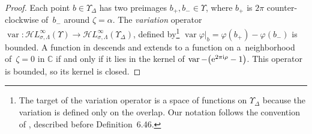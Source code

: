 \documentclass[pdftex]{sigma}
\newcommand{\singexp}[2]{\mathcal{H}L^\infty_{#1, #2}}
\newcommand{\maps}{\colon}
\newcommand{\C}{\mathbb{C}}
\DeclareMathOperator{\var}{var}
\numberwithin{equation}{section}
\begin{document}
\begin{proof}
Each point $b \in \Upsilon_\Delta$ has two preimages $b_+, b_- \in \Upsilon$, where $b_+$ is $2\pi$ counter-clockwise of~$b_-$ around $\zeta = \alpha$. The {\em variation} operator $\var \maps \singexp{\sigma}{\Lambda}(\Upsilon) \to \singexp{\sigma}{\Lambda}(\Upsilon_\Delta)$, defined by\footnote{The target of the variation operator is a space of functions on $\Upsilon_\Delta$ because the variation is defined only on the overlap. Our notation follows the convention of \cite{diverg-resurg-i}, described before Definition~6.46.}
$\var \varphi \big|_b = \varphi(b_+) - \varphi(b_-) $
is bounded. A function in \smash{$\singexp{\sigma}{\Lambda}(\Upsilon)$} descends and extends to a function on a~neighborhood of~${\zeta = 0}$ in $\C$ if and only if it lies in the kernel of $\var - \bigl({\rm e}^{2 \pi {\rm i} \rho} - 1\bigr)$. This operator is bounded, so its kernel is closed.
\end{proof}
\end{document}
